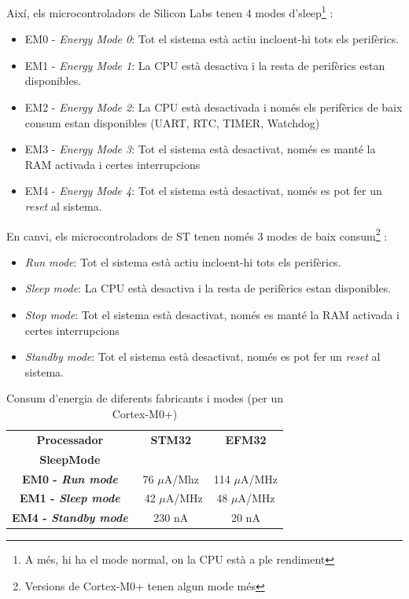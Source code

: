 Així, els microcontroladors de Silicon Labs tenen 4 modes d'sleep\footnote{A més, hi ha el mode normal, on la CPU està a ple rendiment} \cite[6]{EFM32GRM}:
\begin{itemize}
 \item EM0 - {\em Energy Mode 0}: Tot el sistema està actiu incloent-hi tots els perifèrics.
 \item EM1 - {\em Energy Mode 1}: La CPU està desactiva i la resta de perifèrics estan disponibles.
 \item EM2 - {\em Energy Mode 2}: La CPU està desactivada i només els perifèrics de baix consum estan disponibles (UART, RTC, TIMER, Watchdog)
 \item EM3 - {\em Energy Mode 3}: Tot el sistema està desactivat, només es manté la RAM activada i certes interrupcions
 \item EM4 - {\em Energy Mode 4}: Tot el sistema està desactivat, només es pot fer un {\em reset} al sistema.
\end{itemize}

En canvi, els microcontroladors de ST tenen només 3 modes de baix consum\footnote{Versions de Cortex-M0+ tenen algun mode més} \cite[126]{STM32F4RM}:
\begin{itemize}
 \item {\em Run mode}: Tot el sistema està actiu incloent-hi tots els perifèrics.
 \item {\em Sleep mode}: La CPU està desactiva i la resta de perifèrics estan disponibles.
 \item {\em Stop mode}: Tot el sistema està desactivat, només es manté la RAM activada i certes interrupcions
 \item {\em Standby mode}: Tot el sistema està desactivat, només es pot fer un {\em reset} al sistema.
\end{itemize}

\begin{table}
\caption{Consum d'energia de diferents fabricants i modes (per un Cortex-M0+) \cite{EFM32ZG108DS}\cite{STM32L01}}
\centering
\begin{tabular}{|c|c|c|}
\hline
{\bf Processador} & {\bf STM32} & {\bf EFM32}\\
{\bf SleepMode} & & \\
\hline
{\bf EM0 - {\em Run mode}} &  76 $\mu$A/Mhz &  114 $\mu$A/MHz\\
\hline
{\bf EM1 - {\em Sleep mode}} & ~42  $\mu$A/MHz & 48 $\mu$A/MHz\\
\hline
{\bf EM4 - {\em Standby mode}} & 230 nA & 20 nA \\
\hline
\end{tabular}
\label{tb:bin_size}
\end{table}

